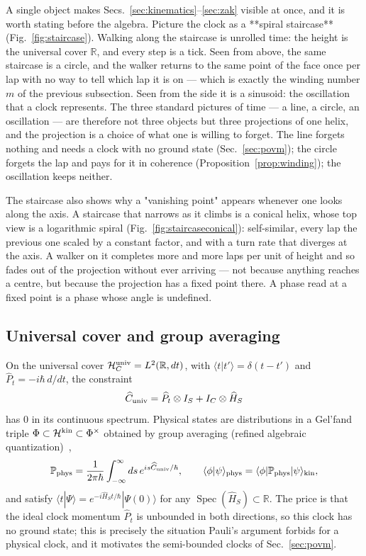\documentclass[aps,prd,onecolumn,notitlepage,10pt,amsmath,amssymb,amsfonts,nofootinbib]{revtex4-2}
\theoremstyle{definition}
\theoremstyle{remark}
\newcommand{\Hil}{\mathcal{H}}
\newcommand{\Hs}{\widehat{H}_S}
\newcommand{\Cop}{\widehat{C}}
\newcommand{\Pt}{\widehat{P}_t}
\newcommand{\R}{\mathbb{R}}
\newcommand{\Spec}{\operatorname{Spec}}
\begin{document}
A single object makes Secs.~\ref{sec:kinematics}--\ref{sec:zak} visible at once, and it is worth stating before the algebra. Picture the clock as a **spiral staircase** (Fig.~\ref{fig:staircase}). Walking along the staircase is unrolled time: the height is the universal cover $\R$, and every step is a tick. Seen from above, the same staircase is a circle, and the walker returns to the same point of the face once per lap with no way to tell which lap it is on --- which is exactly the winding number $m$ of the previous subsection. Seen from the side it is a sinusoid: the oscillation that a clock represents. The three standard pictures of time --- a line, a circle, an oscillation --- are therefore not three objects but three projections of one helix, and the projection is a choice of what one is willing to forget. The line forgets nothing and needs a clock with no ground state (Sec.~\ref{sec:povm}); the circle forgets the lap and pays for it in coherence (Proposition~\ref{prop:winding}); the oscillation keeps neither.

The staircase also shows why a "vanishing point" appears whenever one looks along the axis. A staircase that narrows as it climbs is a conical helix, whose top view is a logarithmic spiral (Fig.~\ref{fig:staircaseconical}): self-similar, every lap the previous one scaled by a constant factor, and with a turn rate that diverges at the axis. A walker on it completes more and more laps per unit of height and so fades out of the projection without ever arriving --- not because anything reaches a centre, but because the projection has a fixed point there. A phase read at a fixed point is a phase whose angle is undefined.

\subsection{Universal cover and group averaging}
On the universal cover $\Hil_C^{\rm univ}=L^2(\R,dt)$, with $\langle t|t'\rangle=\delta(t-t')$ and $\Pt=-i\hbar\,d/dt$, the constraint
\begin{equation}
  \Cop_{\rm univ}=\Pt\otimes I_S+I_C\otimes\Hs
  \label{eq:univ_constraint}
\end{equation}
has $0$ in its continuous spectrum. Physical states are distributions in a Gel'fand triple $\Phi\subset\Hil^{\rm kin}\subset\Phi^\times$ obtained by group averaging (refined algebraic quantization)~\cite{Marolf1995},
\begin{equation}
  \mathbb{P}_{\rm phys}=\frac{1}{2\pi\hbar}\int_{-\infty}^{\infty}ds\,e^{is\Cop_{\rm univ}/\hbar},\qquad
  \langle\phi|\psi\rangle_{\rm phys}=\langle\phi|\mathbb{P}_{\rm phys}|\psi\rangle_{\rm kin},
  \label{eq:group_avg}
\end{equation}
and satisfy $\langle t|\Psi\rangle=e^{-i\Hs t/\hbar}|\Psi(0)\rangle$ for any $\Spec(\Hs)\subset\R$. The price is that the ideal clock momentum $\Pt$ is unbounded in both directions, so this clock has no ground state; this is precisely the situation Pauli's argument forbids for a physical clock, and it motivates the semi-bounded clocks of Sec.~\ref{sec:povm}.
\end{document}
